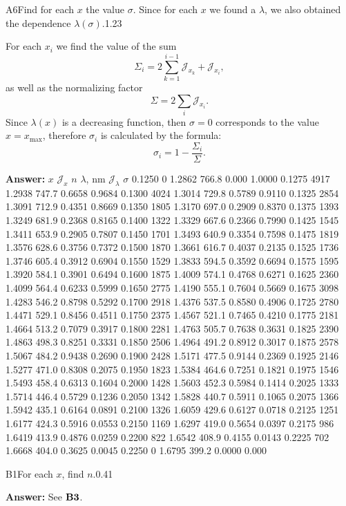 \documentclass[11pt,a4paper]{article}
\begin{document}
\begin{solcard}{A6}{Find for each $x$ the value $\sigma$. Since for each $x$ we found a $\lambda$, we also obtained the dependence $\lambda(\sigma)$.}{1.23}

For each $x_i$ we find the value of the sum \[\Sigma_i=2\sum_{k=1}^{i-1}\mathcal J_{x_k}+\mathcal J_{x_i},\] as well as the normalizing factor \[\Sigma=2\sum_i\mathcal J_{x_i}.\] Since $\lambda(x)$ is a decreasing function, then $\sigma=0$ corresponds to the value $x=x_{\max}$, therefore $\sigma_i$ is calculated by the formula: \[\sigma_i=1-\frac{\Sigma_i}{\Sigma}.\]

\par\smallskip\noindent\textbf{Answer:} $x$ $\mathcal J_x$ $n$ $\lambda$, nm $\mathcal J_\lambda$ $\sigma$ 0.1250 0 1.2862 766.8 0.000 1.0000 0.1275 4917 1.2938 747.7 0.6658 0.9684 0.1300 4024 1.3014 729.8 0.5789 0.9110 0.1325 2854 1.3091 712.9 0.4351 0.8669 0.1350 1805 1.3170 697.0 0.2909 0.8370 0.1375 1393 1.3249 681.9 0.2368 0.8165 0.1400 1322 1.3329 667.6 0.2366 0.7990 0.1425 1545 1.3411 653.9 0.2905 0.7807 0.1450 1701 1.3493 640.9 0.3354 0.7598 0.1475 1819 1.3576 628.6 0.3756 0.7372 0.1500 1870 1.3661 616.7 0.4037 0.2135 0.1525 1736 1.3746 605.4 0.3912 0.6904 0.1550 1529 1.3833 594.5 0.3592 0.6694 0.1575 1595 1.3920 584.1 0.3901 0.6494 0.1600 1875 1.4009 574.1 0.4768 0.6271 0.1625 2360 1.4099 564.4 0.6233 0.5999 0.1650 2775 1.4190 555.1 0.7604 0.5669 0.1675 3098 1.4283 546.2 0.8798 0.5292 0.1700 2918 1.4376 537.5 0.8580 0.4906 0.1725 2780 1.4471 529.1 0.8456 0.4511 0.1750 2375 1.4567 521.1 0.7465 0.4210 0.1775 2181 1.4664 513.2 0.7079 0.3917 0.1800 2281 1.4763 505.7 0.7638 0.3631 0.1825 2390 1.4863 498.3 0.8251 0.3331 0.1850 2506 1.4964 491.2 0.8912 0.3017 0.1875 2578 1.5067 484.2 0.9438 0.2690 0.1900 2428 1.5171 477.5 0.9144 0.2369 0.1925 2146 1.5277 471.0 0.8308 0.2075 0.1950 1823 1.5384 464.6 0.7251 0.1821 0.1975 1546 1.5493 458.4 0.6313 0.1604 0.2000 1428 1.5603 452.3 0.5984 0.1414 0.2025 1333 1.5714 446.4 0.5729 0.1236 0.2050 1342 1.5828 440.7 0.5911 0.1065 0.2075 1366 1.5942 435.1 0.6164 0.0891 0.2100 1326 1.6059 429.6 0.6127 0.0718 0.2125 1251 1.6177 424.3 0.5916 0.0553 0.2150 1169 1.6297 419.0 0.5654 0.0397 0.2175 986 1.6419 413.9 0.4876 0.0259 0.2200 822 1.6542 408.9 0.4155 0.0143 0.2225 702 1.6668 404.0 0.3625 0.0045 0.2250 0 1.6795 399.2 0.0000 0.000
\end{solcard}

\begin{solcard}{B1}{For each $x$, find $n$.}{0.41}
\par\smallskip\noindent\textbf{Answer:} See $\bf B3$.
\end{solcard}
\end{document}
